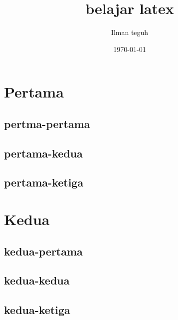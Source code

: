 \documentclass[12pt]{article}
\begin{document}
	\tableofcontents
	\title{belajar latex}
	\author{Ilman teguh}
	\date{\today}
	\maketitle
	\section{Pertama}
		\subsection{pertma-pertama}
		\subsection{pertama-kedua}
		\subsection{pertama-ketiga}
	\section{Kedua}
	\subsection{kedua-pertama}
	\subsection{kedua-kedua}
	\subsection{kedua-ketiga}
\end{document}
